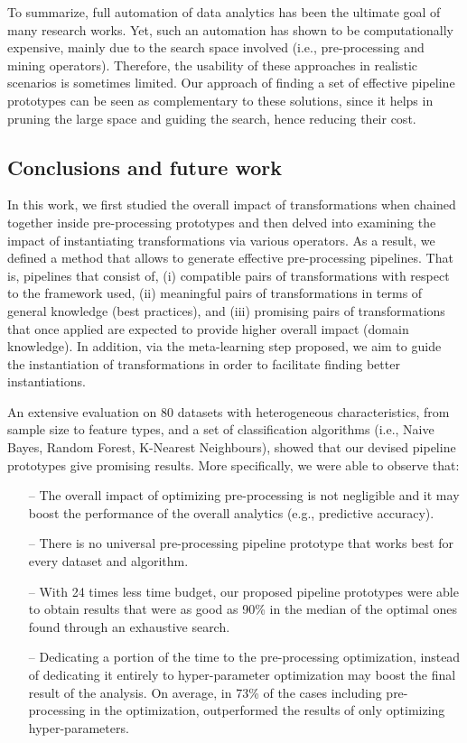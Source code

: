 To summarize, full automation of data analytics has been the ultimate goal of many research works. Yet, such an automation has shown to be computationally expensive, mainly due to the search space involved (i.e., pre-processing and mining operators). Therefore, the usability of these approaches in realistic scenarios is sometimes limited. Our approach of finding a set of effective pipeline prototypes can be seen as complementary to these solutions, since it helps in pruning the large space and guiding the search, hence reducing their cost.

\subsection{Conclusions and future work}
\label{ssec:conclusions}

In this work, we first studied the overall impact of transformations when chained together inside pre-processing prototypes and then delved into examining the impact of instantiating transformations via various operators. As a result, we defined a method that allows to generate effective pre-processing pipelines. That is, pipelines that consist of, (i) compatible pairs of transformations with respect to the framework used,  (ii) meaningful pairs of transformations in terms of general knowledge (best practices), and (iii) promising pairs of transformations that once applied are expected to provide higher overall impact (domain knowledge). 
In addition, via the meta-learning step proposed, we aim to guide the instantiation of transformations in order to facilitate finding better instantiations.

An extensive evaluation on 80 datasets with heterogeneous characteristics, from sample size to feature types, and a set of classification algorithms (i.e., Naive Bayes, Random Forest, K-Nearest Neighbours), showed that our devised pipeline prototypes give promising results. More specifically, we were able to observe that:
\begin{itemize}
    \item [--] The overall impact of optimizing pre-processing is not negligible and it may boost the performance of the overall analytics (e.g., predictive accuracy).
    \item [--] There is no universal pre-processing pipeline prototype that works best for every dataset and algorithm.
    \item [--] With 24 times less time budget, our proposed pipeline prototypes were able to obtain results that were as good as 90\% in the median of the optimal ones found through an exhaustive search.
    \item [--] Dedicating a portion of the time to the pre-processing optimization, instead of dedicating it entirely to hyper-parameter optimization may boost %
    the final result of the analysis. On average, in 73\% of the cases including pre-processing in the optimization, outperformed the results of only optimizing hyper-parameters.
\end{itemize}

